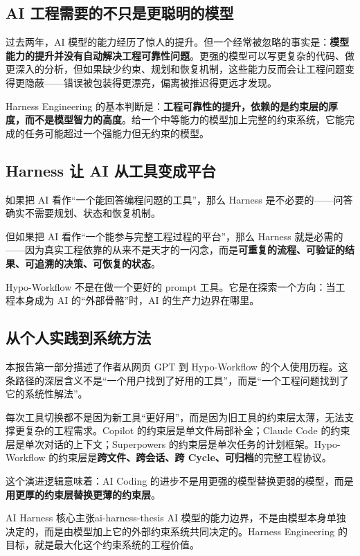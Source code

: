 \documentclass[
  outputdir=build,
  chapterstyle=cn,
  colorscheme=Simple,
  fontset=tech,
  code=false
]{Hypo-Note}
\begin{document}
\subsection{AI 工程需要的不只是更聪明的模型}

过去两年，AI 模型的能力经历了惊人的提升。但一个经常被忽略的事实是：\textbf{模型能力的提升并没有自动解决工程可靠性问题}。更强的模型可以写更复杂的代码、做更深入的分析，但如果缺少约束、规划和恢复机制，这些能力反而会让工程问题变得更隐蔽——错误被包装得更漂亮，偏离被推迟得更远才发现。

Harness Engineering 的基本判断是：\textbf{工程可靠性的提升，依赖的是约束层的厚度，而不是模型智力的高度}。给一个中等能力的模型加上完整的约束系统，它能完成的任务可能超过一个强能力但无约束的模型。

\subsection{Harness 让 AI 从工具变成平台}

如果把 AI 看作“一个能回答编程问题的工具”，那么 Harness 是不必要的——问答确实不需要规划、状态和恢复机制。

但如果把 AI 看作“一个能参与完整工程过程的平台”，那么 Harness 就是必需的——因为真实工程依靠的从来不是天才的一闪念，而是\textbf{可重复的流程、可验证的结果、可追溯的决策、可恢复的状态}。

Hypo-Workflow 不是在做一个更好的 prompt 工具。它是在探索一个方向：当工程本身成为 AI 的“外部骨骼”时，AI 的生产力边界在哪里。

\subsection{从个人实践到系统方法}

本报告第一部分描述了作者从网页 GPT 到 Hypo-Workflow 的个人使用历程。这条路径的深层含义不是“一个用户找到了好用的工具”，而是“一个工程问题找到了它的系统性解法”。

每次工具切换都不是因为新工具“更好用”，而是因为旧工具的约束层太薄，无法支撑更复杂的工程需求。Copilot 的约束层是单文件局部补全；Claude Code 的约束层是单次对话的上下文；Superpowers 的约束层是单次任务的计划框架。Hypo-Workflow 的约束层是\textbf{跨文件、跨会话、跨 Cycle、可归档}的完整工程协议。

这个演进逻辑意味着：AI Coding 的进步不是用更强的模型替换更弱的模型，而是\textbf{用更厚的约束层替换更薄的约束层}。

\begin{important}{AI Harness 核心主张}{ai-harness-thesis}
AI 模型的能力边界，不是由模型本身单独决定的，而是由模型加上它的外部约束系统共同决定的。Harness Engineering 的目标，就是最大化这个约束系统的工程价值。
\end{important}
\end{document}
